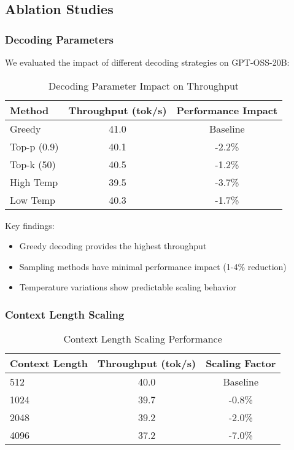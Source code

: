 \documentclass[11pt]{article}
\begin{document}
\subsection{Ablation Studies}

\subsubsection{Decoding Parameters}

We evaluated the impact of different decoding strategies on GPT-OSS-20B:

\begin{table}[h]
\centering
\caption{Decoding Parameter Impact on Throughput}
\begin{tabular}{lcc}
\toprule
Method & Throughput (tok/s) & Performance Impact \\
\midrule
Greedy & 41.0 & Baseline \\
Top-p (0.9) & 40.1 & -2.2\% \\
Top-k (50) & 40.5 & -1.2\% \\
High Temp & 39.5 & -3.7\% \\
Low Temp & 40.3 & -1.7\% \\
\bottomrule
\end{tabular}
\end{table}

Key findings:
\begin{itemize}
    \item Greedy decoding provides the highest throughput
    \item Sampling methods have minimal performance impact (1-4\% reduction)
    \item Temperature variations show predictable scaling behavior
\end{itemize}

\subsubsection{Context Length Scaling}

\begin{table}[h]
\centering
\caption{Context Length Scaling Performance}
\begin{tabular}{lcc}
\toprule
Context Length & Throughput (tok/s) & Scaling Factor \\
\midrule
512 & 40.0 & Baseline \\
1024 & 39.7 & -0.8\% \\
2048 & 39.2 & -2.0\% \\
4096 & 37.2 & -7.0\% \\
\bottomrule
\end{tabular}
\end{table}
\end{document}
